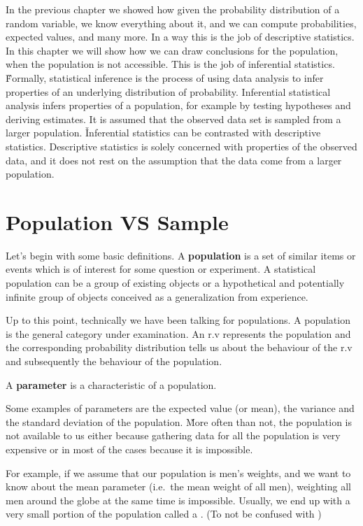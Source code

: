 In the previous chapter we showed how given the probability distribution of a random variable, we know everything
about it, and we can compute probabilities, expected values, and many more. In a way this is the job of descriptive
statistics. In this chapter we will show how we can draw conclusions for the population, when the population is not
accessible. This is the job of inferential statistics. \v

Formally, statistical inference is the process of using data analysis to infer properties of an underlying
distribution of probability. Inferential statistical analysis infers properties of a population, for example by
testing hypotheses and deriving estimates. It is assumed that the observed data set is sampled from a larger
population. \v

Inferential statistics can be contrasted with descriptive statistics. Descriptive statistics is solely concerned with
properties of the observed data, and it does not rest on the assumption that the data come from a larger population.

\section{Population VS Sample}

Let's begin with some basic definitions.
\bd[Population]
A \textbf{population} is a set of similar items or events which is of interest for some question or experiment. A
statistical population can be a group of existing objects or a hypothetical and potentially infinite group of objects
conceived as a generalization from experience.
\ed

Up to this point, technically we have been talking for populations. A population is the general category under
examination. An r.v represents the population and the corresponding probability distribution tells us about the
behaviour of the r.v and subsequently the behaviour of the population.

\bd[Parameter]
A \textbf{parameter} is a characteristic of a population.
\ed

Some examples of parameters are the expected value (or mean), the variance and the standard deviation of the
population. \v

More often than not, the population is not available to us either because gathering data for all the population is
very expensive or in most of the cases because it is impossible.

\be
For example, if we assume that our population is men's weights, and we want to know about the mean parameter (i.e.\ the
mean weight of all men), weighting all men around the globe at the same time is impossible. Usually, we end up with a
very small portion of the population called a . (To not be confused with )
\ee

